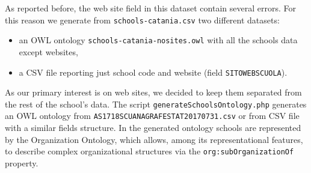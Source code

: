 \documentclass{article}
\begin{document}
As reported before, the web site field in this dataset contain several errors. For this reason we generate from 
\texttt{schools-catania.csv} two different datasets:
\begin{itemize}
	\item an OWL ontology \texttt{schools-catania-nosites.owl} with all the schools data except websites,
	\item a CSV file reporting just school code and website (field \texttt{SITOWEBSCUOLA}).
\end{itemize}

As our primary interest is on web sites, we decided to keep them separated from the rest of the school's data.
The script \texttt{generateSchoolsOntology.php} generates an OWL ontology from \texttt{AS1718SCUANAGRAFESTAT20170731.csv} 
or from CSV file with a similar fields structure. In the generated ontology schools are represented by the Organization Ontology,
which allows, among its representational features, to describe complex organizational structures via the \texttt{org:subOrganizationOf}
property.    
 
\end{document}
